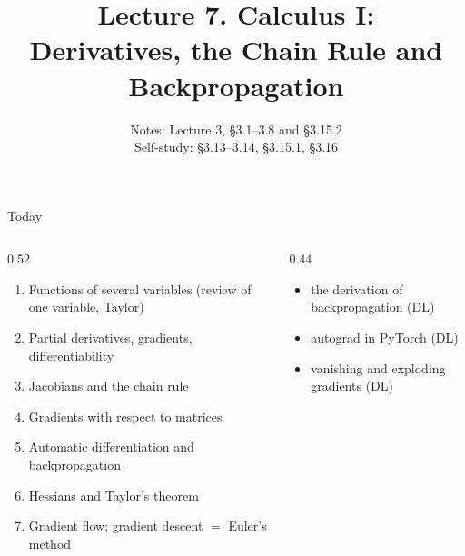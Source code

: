 \documentclass[aspectratio=1610,11pt]{beamer}
\title[Lecture 7 · Calculus I]{Lecture 7. Calculus I:\\ Derivatives, the Chain Rule and Backpropagation}
\subtitle{Notes: Lecture 3, \S3.1--3.8 and \S3.15.2\\ Self-study: \S3.13--3.14, \S3.15.1, \S3.16}
\begin{document}
\begin{frame}[plain]
    \titlepage
\end{frame}

\begin{frame}{Today}
    \begin{columns}[T]
        \begin{column}{0.52\linewidth}
            \begin{enumerate}\small
                \item Functions of several variables (review of one variable, Taylor)
                \item Partial derivatives, gradients, differentiability
                \item Jacobians and the chain rule
                \item Gradients with respect to matrices
                \item Automatic differentiation and backpropagation
                \item Hessians and Taylor's theorem
                \item Gradient flow; gradient descent $=$ Euler's method
            \end{enumerate}
        \end{column}
        \begin{column}{0.44\linewidth}
            \begin{mlbox}[Used in]
                \small
                \begin{itemize}
                    \item the derivation of backpropagation (DL)
                    \item autograd in PyTorch (DL)
                    \item vanishing and exploding gradients (DL)
                \end{itemize}
            \end{mlbox}
        \end{column}
    \end{columns}
\end{frame}
\end{document}
